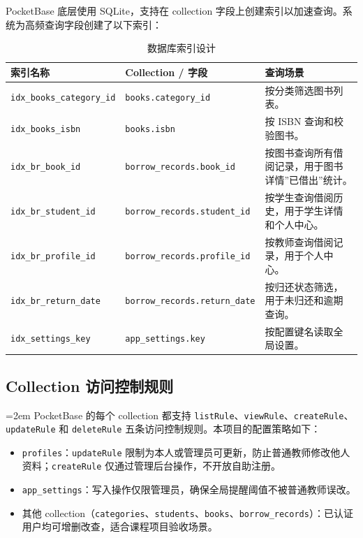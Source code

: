 PocketBase 底层使用 SQLite，支持在 collection 字段上创建索引以加速查询。系统为高频查询字段创建了以下索引：

\begin{table}[htbp]
    \centering
    \caption{数据库索引设计}
    \label{tab:index-design}
    \footnotesize
    \begin{tabularx}{0.95\textwidth}{l>{\RaggedRight\arraybackslash}p{}>{\RaggedRight\arraybackslash}X}
        \toprule
        \textbf{索引名称}                     & \textbf{Collection / 字段}              & \textbf{查询场景}              \\
        \midrule
        \texttt{idx\_books\_category\_id} & \texttt{books.category\_id}           & 按分类筛选图书列表。                 \\
        \texttt{idx\_books\_isbn}         & \texttt{books.isbn}                   & 按 ISBN 查询和校验图书。            \\
        \texttt{idx\_br\_book\_id}        & \texttt{borrow\_records.book\_id}     & 按图书查询所有借阅记录，用于图书详情”已借出”统计。 \\
        \texttt{idx\_br\_student\_id}     & \texttt{borrow\_records.student\_id}  & 按学生查询借阅历史，用于学生详情和个人中心。     \\
        \texttt{idx\_br\_profile\_id}     & \texttt{borrow\_records.profile\_id}  & 按教师查询借阅记录，用于个人中心。          \\
        \texttt{idx\_br\_return\_date}    & \texttt{borrow\_records.return\_date} & 按归还状态筛选，用于未归还和逾期查询。        \\
        \texttt{idx\_settings\_key}       & \texttt{app\_settings.key}            & 按配置键名读取全局设置。               \\
        \bottomrule
    \end{tabularx}
\end{table}

\subsection{Collection 访问控制规则}

{\RaggedRight\emergencystretch=2em PocketBase\hspace{0pt} 的每个 collection 都支持 \texttt{listRule}、\texttt{viewRule}、\texttt{createRule}、\texttt{updateRule}\hspace{0pt} 和 \texttt{deleteRule}\hspace{0pt} 五条访问控制规则。本项目的配置策略如下：\par}

\begin{itemize}
    \item \texttt{profiles}：\texttt{updateRule} 限制为本人或管理员可更新，防止普通教师修改他人资料；\texttt{createRule} 仅通过管理后台操作，不开放自助注册。
    \item \texttt{app\_settings}：写入操作仅限管理员，确保全局提醒阈值不被普通教师误改。
    \item 其他 collection（\texttt{categories}、\texttt{students}、\texttt{books}、\texttt{borrow\_records}）：已认证用户均可增删改查，适合课程项目验收场景。
\end{itemize}
